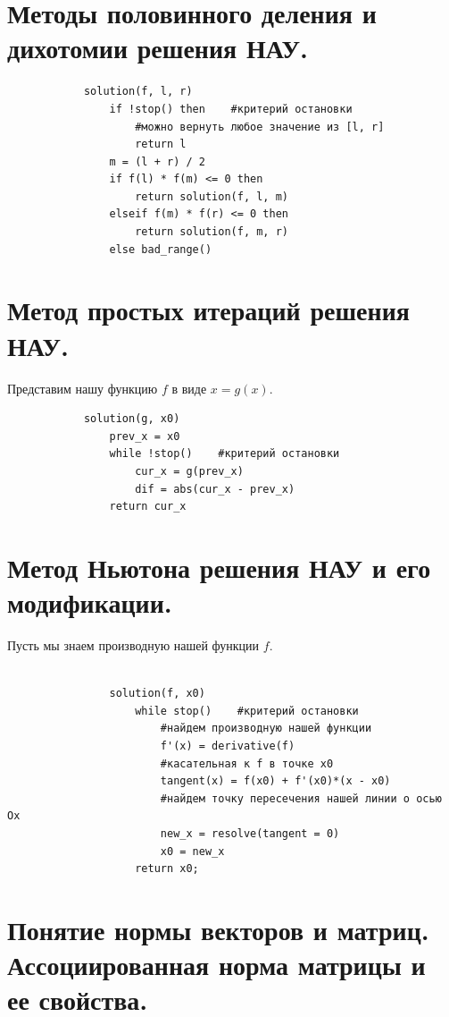 \documentclass[16pt]{article}
\begin{document}
		\section{Методы половинного деления и дихотомии решения НАУ.}
			\begin{verbatim}
            solution(f, l, r)
                if !stop() then    #критерий остановки
                    #можно вернуть любое значение из [l, r] 
                    return l    
                m = (l + r) / 2
                if f(l) * f(m) <= 0 then
                    return solution(f, l, m)
                elseif f(m) * f(r) <= 0 then
                    return solution(f, m, r)
                else bad_range()
			\end{verbatim}
		\section{Метод простых итераций решения НАУ.}
            Представим нашу функцию $f$ в виде $x = g(x)$.
            \begin{verbatim}
            solution(g, x0)
                prev_x = x0
                while !stop()    #критерий остановки
                    cur_x = g(prev_x)
                    dif = abs(cur_x - prev_x)
                return cur_x 
            \end{verbatim}
		\section{Метод Ньютона решения НАУ и его модификации.}
            Пусть мы знаем производную нашей функции $f$.
		    \\ \\ %
            \begin{verbatim}
                solution(f, x0)
                    while stop()    #критерий остановки
                        #найдем производную нашей функции 
                        f'(x) = derivative(f)    
                        #касательная к f в точке x0
                        tangent(x) = f(x0) + f'(x0)*(x - x0)
                        #найдем точку пересечения нашей линии о осью Ox    
                        new_x = resolve(tangent = 0) 
                        x0 = new_x
                    return x0;                    
            \end{verbatim}
		\section{Понятие нормы векторов и матриц. Ассоциированная норма матрицы и ее свойства.}
\end{document}
